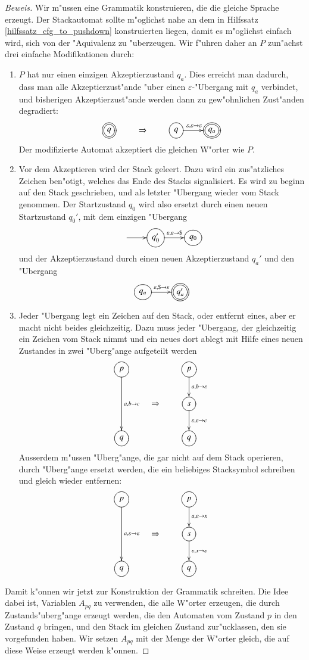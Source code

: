 \begin{proof}[Beweis]
Wir m"ussen eine Grammatik konstruieren, die die gleiche Sprache
erzeugt. Der Stackautomat sollte m"oglichst nahe an dem in
Hilfssatz \ref{hilfssatz_cfg_to_pushdown} konstruierten liegen, damit es
m"oglichst einfach wird, sich von der "Aquivalenz zu "uberzeugen.
Wir f"uhren daher an $P$ zun"achst drei einfache Modifikationen
durch: 
\begin{enumerate}
\item $P$ hat nur einen einzigen Akzeptierzustand
$q_a$.
Dies erreicht man dadurch, dass man alle Akzeptierzust"ande "uber
einen $\varepsilon$-"Ubergang mit
$q_a$ verbindet, und bisherigen Akzeptierzust"ande
werden dann zu gew"ohnlichen Zust"anden degradiert:
\[
\xymatrix{
*++[o][F=]{q}
	&\Rightarrow
		&*++[o][F]{q}\ar[r]^{\varepsilon,\varepsilon\to\varepsilon}
			&*++[o][F=]{q_a}
}		
\]
Der modifizierte Automat akzeptiert die gleichen W"orter wie $P$.
\item Vor dem Akzeptieren wird der Stack geleert. Dazu wird ein zus"atzliches
Zeichen ben"otigt, welches das Ende des Stacks signalisiert. Es wird zu
beginn auf den Stack geschrieben, und als letzter "Ubergang wieder
vom Stack genommen. Der Startzustand $q_0$ wird also ersetzt durch einen neuen
Startzustand $q_0'$, mit dem einzigen "Ubergang 
\[
\entrymodifiers={++[o][F]}
\xymatrix{
*+\txt{}\ar[r]
	&{q_0'}\ar[r]^{\varepsilon,\varepsilon\to {\tt\$}}
		&q_0
}
\]
und der Akzeptierzustand  durch einen neuen Akzeptierzustand $q_a'$ und
den "Ubergang
\[
\entrymodifiers={++[o][F]}
\xymatrix{
{q_a}\ar[r]^{\varepsilon,{\tt\$}\to\varepsilon}
	&*++[o][F=]{q_a'}
}
\]
\item Jeder "Ubergang legt ein Zeichen auf den Stack, oder entfernt
eines, aber er macht nicht beides gleichzeitig. Dazu muss jeder "Ubergang,
der gleichzeitig ein Zeichen vom Stack nimmt und ein neues dort ablegt
mit Hilfe eines neuen Zustandes in zwei "Uberg"ange aufgeteilt werden
\[
\xymatrix{
*++[o][F]{p}\ar[dd]^{a,b\to c}
	&*+\txt{}
		&*++[o][F]{p}\ar[d]^{a,b\to\varepsilon}
\\
	&\Rightarrow
		&*++[o][F]{s}\ar[d]^{\varepsilon,\varepsilon\to c}
\\
*++[o][F]{q}
	&
		&*++[o][F]{q}
}
\]
Ausserdem m"ussen "Uberg"ange, die gar nicht auf dem Stack operieren,
durch "Uberg"ange ersetzt werden, die ein beliebiges Stacksymbol
schreiben und gleich wieder entfernen:
\[
\xymatrix{
*++[o][F]{p}\ar[dd]^{a,\varepsilon\to \varepsilon}
	&*+\txt{}
		&*++[o][F]{p}\ar[d]^{a,\varepsilon\to x}
\\
	&\Rightarrow
		&*++[o][F]{s}\ar[d]^{\varepsilon,x\to \varepsilon}
\\
*++[o][F]{q}
	&
		&*++[o][F]{q}
}
\]
\end{enumerate}
Damit k"onnen wir jetzt zur Konstruktion der Grammatik schreiten.
Die Idee dabei ist, Variablen $A_{pq}$ zu verwenden, die alle 
W"orter erzeugen, die durch Zustands"uberg"ange erzeugt werden,
die den Automaten vom Zustand $p$ in den Zustand $q$ bringen,
und den Stack im gleichen Zustand zur"ucklassen, den sie vorgefunden
haben.
Wir setzen $A_{pq}$ mit der Menge der W"orter gleich, die
auf diese Weise erzeugt werden k"onnen.


\end{proof}
